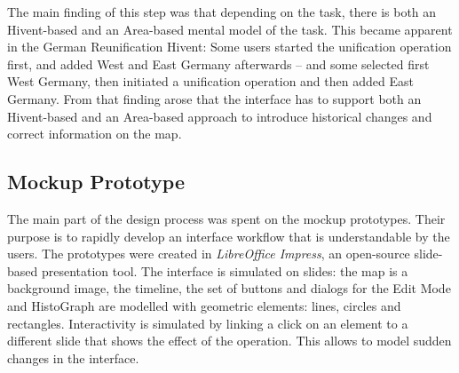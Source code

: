 The main finding of this step was that depending on the task, there is both an Hivent-based and an Area-based mental model of the task. This became apparent in the German Reunification Hivent: Some users started the unification operation first, and added West and East Germany afterwards -- and some selected first West Germany, then initiated a unification operation and then added East Germany. From that finding arose that the interface has to support both an Hivent-based and an Area-based approach to introduce historical changes and correct information on the map.


\subsection{Mockup Prototype} %
\label{sub:mockup_prototype}

The main part of the design process was spent on the mockup prototypes. Their purpose is to rapidly develop an interface workflow that is understandable by the users. The prototypes were created in \emph{LibreOffice Impress}, an open-source slide-based presentation tool. The interface is simulated on slides: the map is a background image, the timeline, the set of buttons and dialogs for the Edit Mode and HistoGraph are modelled with geometric elements: lines, circles and rectangles. Interactivity is simulated by linking a click on an element to a different slide that shows the effect of the operation. This allows to model sudden changes in the interface.

